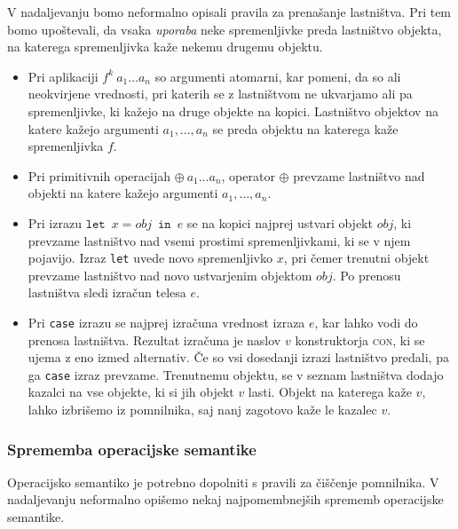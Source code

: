 V nadaljevanju bomo neformalno opisali pravila za prenašanje lastništva. Pri tem bomo upoštevali, da vsaka \emph{uporaba} neke spremenljivke preda lastništvo objekta, na katerega spremenljivka kaže nekemu drugemu objektu.

\begin{itemize}
    \itemsep 0em
    \item Pri aplikaciji $f^k \: a_1 \dots a_n$ so argumenti atomarni, kar pomeni, da so ali neokvirjene vrednosti, pri katerih se z lastništvom ne ukvarjamo ali pa spremenljivke, ki kažejo na druge objekte na kopici. Lastništvo objektov na katere kažejo argumenti $a_1, \dots, a_n$ se preda objektu na katerega kaže spremenljivka $f$.
    \item Pri primitivnih operacijah $\oplus \: a_1 \dots a_n$, operator $\oplus$ prevzame lastništvo nad objekti na katere kažejo argumenti $a_1, \dots, a_n$.
    \item Pri izrazu $\texttt{let} \enspace x = obj \enspace \texttt{in} \enspace e$ se na kopici najprej ustvari objekt $obj$, ki prevzame lastništvo nad vsemi prostimi spremenljivkami, ki se v njem pojavijo. Izraz \texttt{let} uvede novo spremenljivko $x$, pri čemer trenutni objekt prevzame lastništvo nad novo ustvarjenim objektom $obj$. Po prenosu lastništva sledi izračun telesa $e$.
    \item Pri \texttt{case} izrazu se najprej izračuna vrednost izraza $e$, kar lahko vodi do prenosa lastništva. Rezultat izračuna je naslov $v$ konstruktorja \textsc{con}, ki se ujema z eno izmed alternativ. Če so vsi dosedanji izrazi lastništvo predali, pa ga \texttt{case} izraz prevzame. Trenutnemu objektu, se v seznam lastništva dodajo kazalci na vse objekte, ki si jih objekt $v$ lasti. Objekt na katerega kaže $v$, lahko izbrišemo iz pomnilnika, saj nanj zagotovo kaže le kazalec $v$.
\end{itemize}

\subsubsection{Sprememba operacijske semantike}

Operacijsko semantiko je potrebno dopolniti s pravili za čiščenje pomnilnika. V nadaljevanju neformalno opišemo nekaj najpomembnejših sprememb operacijske semantike.

